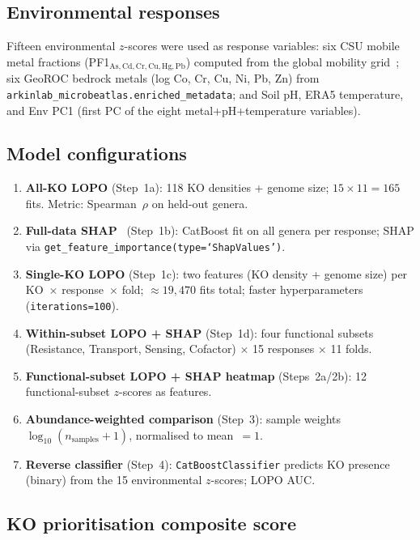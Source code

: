 \documentclass[11pt]{article}
\begin{document}
\subsection{Environmental responses}

Fifteen environmental $z$-scores were used as response variables:
six CSU mobile metal fractions (PF1$_{\mathrm{As,Cd,Cr,Cu,Hg,Pb}}$) computed
from the global mobility grid~\cite{qi2025}; six GeoROC bedrock
metals (log Co, Cr, Cu, Ni, Pb, Zn) from
\texttt{arkinlab\_microbeatlas.enriched\_metadata}; and Soil pH, ERA5
temperature, and Env PC1 (first PC of the eight metal+pH+temperature variables).

\subsection{Model configurations}

\begin{enumerate}
  \item \textbf{All-KO LOPO} (Step~1a): 118 KO densities + genome size;
        $15 \times 11 = 165$ fits. Metric: Spearman~$\rho$ on held-out genera.
  \item \textbf{Full-data SHAP}~\cite{lundberg2017} (Step~1b): CatBoost fit on all genera per
        response; SHAP via \texttt{get\_feature\_importance(type=`ShapValues')}.
  \item \textbf{Single-KO LOPO} (Step~1c): two features (KO density + genome
        size) per KO~$\times$ response~$\times$ fold; $\approx\!19{,}470$ fits
        total; faster hyperparameters (\texttt{iterations=100}).
  \item \textbf{Within-subset LOPO + SHAP} (Step~1d): four functional subsets
        (Resistance, Transport, Sensing, Cofactor) $\times$ 15 responses
        $\times$ 11 folds.
  \item \textbf{Functional-subset LOPO + SHAP heatmap} (Steps~2a/2b):
        12 functional-subset $z$-scores as features.
  \item \textbf{Abundance-weighted comparison} (Step~3): sample weights
        $\log_{10}(n_\text{samples}+1)$, normalised to mean~$= 1$.
  \item \textbf{Reverse classifier} (Step~4): \texttt{CatBoostClassifier}
        predicts KO presence (binary) from the 15 environmental $z$-scores;
        LOPO AUC.
\end{enumerate}

\subsection{KO prioritisation composite score}
\end{document}
